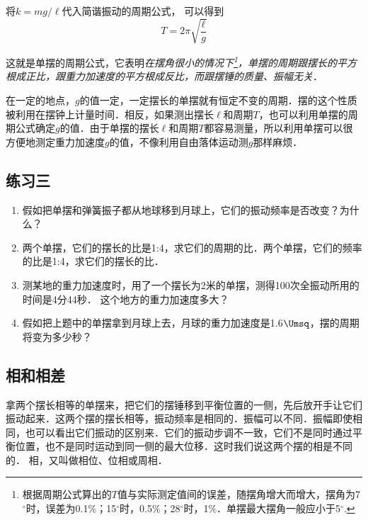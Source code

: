 将$k=mg/\ell$代入简谐振动的周期公式，
可以得到
\[T=2\pi\sqrt{\frac{\ell}{g}}\]

这就是单摆的周期公式，它表明\textit{在摆角很小的情况下\footnote{根据周期公式算出的$T$值与实际测定值间的误差，随摆角增大而增大，摆角为7$^\circ$时，误差为0.1\%；15$^\circ$时，0.5\%；28$^\circ$时，1\%．单摆最大摆角一般应小于5$^\circ$.}，单摆的周期跟摆长的平方根成正比，跟重力加速度的平方根成反比，而跟摆锤的质量、振幅无关}．

在一定的地点，$g$的值一定，一定摆长的单摆就有恒定不变的周期．摆的这个性质被利用在摆钟上计量时间．相反，如果测出摆长$\ell$和周期$T$，也可以利用单摆的周期公式确定$g$的值．由于单摆的摆长$\ell$和周期$T$都容易测量，所以利用单摆可以很方便地测定重力加速度$g$的值，不像利用自由落体运动测$g$那样麻烦．

\subsection*{练习三}
\begin{enumerate}
    \item 假如把单摆和弹簧振子都从地球移到月球上，它们的振动频率是否改变？为什么？
    \item 两个单摆，它们的摆长的比是1:4，求它们的周期的比．两个单摆，它们的频率的比是1:4，求它们的摆长的比．
    \item 测某地的重力加速度时，用了一个摆长为2米的单摆，测得100次全振动所用的时间是4分44秒．
    这个地方的重力加速度多大？
    \item 假如把上题中的单摆拿到月球上去，月球的重力加速度是1.6$\Umsq$，摆的周期将变为多少秒？
\end{enumerate}

\subsection{相和相差}
拿两个摆长相等的单摆来，把它们的摆锤移到平衡位置的一侧，先后放开手让它们振动起来．这两个摆的摆长相等，振动频率是相同的．振幅可以不同．振幅即使相同，也可以看出它们振动的区别来．它们的振动步调不一致，它们不是同时通过平衡位置，也不是同时运动到同一侧的最大位移．这时我们说这两个摆的相是不同的．
相，又叫做相位、位相或周相．

